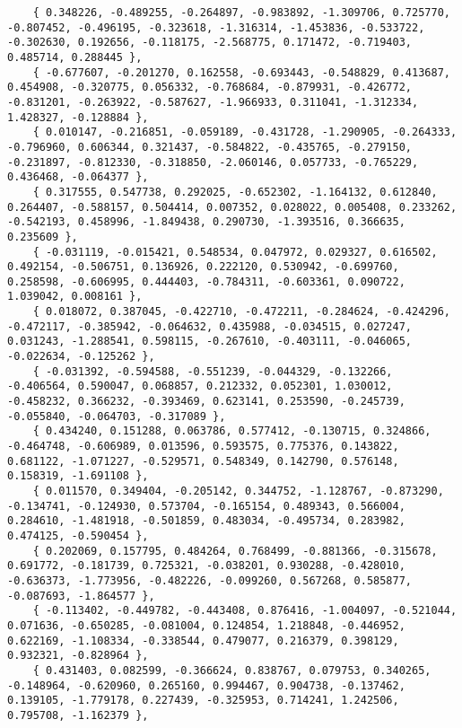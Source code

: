 \documentclass[a4paper]{article}
\begin{document}
\begin{lstlisting}
    { 0.348226, -0.489255, -0.264897, -0.983892, -1.309706, 0.725770, -0.807452, -0.496195, -0.323618, -1.316314, -1.453836, -0.533722, -0.302630, 0.192656, -0.118175, -2.568775, 0.171472, -0.719403, 0.485714, 0.288445 }, 
    { -0.677607, -0.201270, 0.162558, -0.693443, -0.548829, 0.413687, 0.454908, -0.320775, 0.056332, -0.768684, -0.879931, -0.426772, -0.831201, -0.263922, -0.587627, -1.966933, 0.311041, -1.312334, 1.428327, -0.128884 }, 
    { 0.010147, -0.216851, -0.059189, -0.431728, -1.290905, -0.264333, -0.796960, 0.606344, 0.321437, -0.584822, -0.435765, -0.279150, -0.231897, -0.812330, -0.318850, -2.060146, 0.057733, -0.765229, 0.436468, -0.064377 }, 
    { 0.317555, 0.547738, 0.292025, -0.652302, -1.164132, 0.612840, 0.264407, -0.588157, 0.504414, 0.007352, 0.028022, 0.005408, 0.233262, -0.542193, 0.458996, -1.849438, 0.290730, -1.393516, 0.366635, 0.235609 }, 
    { -0.031119, -0.015421, 0.548534, 0.047972, 0.029327, 0.616502, 0.492154, -0.506751, 0.136926, 0.222120, 0.530942, -0.699760, 0.258598, -0.606995, 0.444403, -0.784311, -0.603361, 0.090722, 1.039042, 0.008161 }, 
    { 0.018072, 0.387045, -0.422710, -0.472211, -0.284624, -0.424296, -0.472117, -0.385942, -0.064632, 0.435988, -0.034515, 0.027247, 0.031243, -1.288541, 0.598115, -0.267610, -0.403111, -0.046065, -0.022634, -0.125262 }, 
    { -0.031392, -0.594588, -0.551239, -0.044329, -0.132266, -0.406564, 0.590047, 0.068857, 0.212332, 0.052301, 1.030012, -0.458232, 0.366232, -0.393469, 0.623141, 0.253590, -0.245739, -0.055840, -0.064703, -0.317089 }, 
    { 0.434240, 0.151288, 0.063786, 0.577412, -0.130715, 0.324866, -0.464748, -0.606989, 0.013596, 0.593575, 0.775376, 0.143822, 0.681122, -1.071227, -0.529571, 0.548349, 0.142790, 0.576148, 0.158319, -1.691108 }, 
    { 0.011570, 0.349404, -0.205142, 0.344752, -1.128767, -0.873290, -0.134741, -0.124930, 0.573704, -0.165154, 0.489343, 0.566004, 0.284610, -1.481918, -0.501859, 0.483034, -0.495734, 0.283982, 0.474125, -0.590454 }, 
    { 0.202069, 0.157795, 0.484264, 0.768499, -0.881366, -0.315678, 0.691772, -0.181739, 0.725321, -0.038201, 0.930288, -0.428010, -0.636373, -1.773956, -0.482226, -0.099260, 0.567268, 0.585877, -0.087693, -1.864577 }, 
    { -0.113402, -0.449782, -0.443408, 0.876416, -1.004097, -0.521044, 0.071636, -0.650285, -0.081004, 0.124854, 1.218848, -0.446952, 0.622169, -1.108334, -0.338544, 0.479077, 0.216379, 0.398129, 0.932321, -0.828964 }, 
    { 0.431403, 0.082599, -0.366624, 0.838767, 0.079753, 0.340265, -0.148964, -0.620960, 0.265160, 0.994467, 0.904738, -0.137462, 0.139105, -1.779178, 0.227439, -0.325953, 0.714241, 1.242506, 0.795708, -1.162379 }, 

\end{lstlisting}
\end{document}
